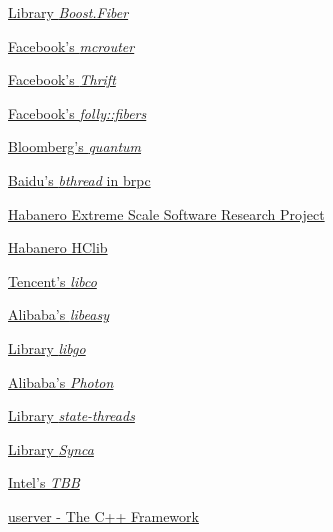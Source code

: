 \begin{thebibliography}{99}
        \href{http://www.boost.org/doc/libs/release/libs/fiber/doc/html/index.html}
        {Library \emph{Boost.Fiber}}

        \href{https://code.facebook.com/posts/296442737213493/introducing-mcrouter-a-memcached-protocol-router-for-scaling-memcached-deployments}
        {Facebook's \emph{mcrouter}}

        \href{https://github.com/facebook/fbthrift}
        {Facebook's \emph{Thrift}}

        \href{https://github.com/facebook/folly/tree/master/folly/fibers}
        {Facebook's \emph{folly::fibers}}

        \href{https://github.com/bloomberg/quantum}
        {Bloomberg's \emph{quantum}}

        \href{https://brpc.apache.org/docs/bthread/}
        {Baidu's \emph{bthread} in brpc}

        \href{https://wiki.rice.edu/confluence/display/HABANERO/Habanero+Extreme+Scale+Software+Research+Project}
        {Habanero Extreme Scale Software Research Project}

        \href{https://github.com/habanero-rice/hclib}
        {Habanero HClib}

        \href{https://github.com/Tencent/libco}
        {Tencent's \emph{libco}}

        \href{https://github.com/oceanbase/oceanbase/tree/develop/deps/easy}
        {Alibaba's \emph{libeasy}}

        \href{https://github.com/yyzybb537/libgo}
        {Library \emph{libgo}}

        \href{https://github.com/alibaba/PhotonLibOS}
        {Alibaba's \emph{Photon}}

        \href{https://github.com/ossrs/state-threads}
        {Library \emph{state-threads}}

        \href{https://github.com/gridem/Synca}
        {Library \emph{Synca}}

        \href{https://github.com/intel/tbb}
        {Intel's \emph{TBB}}

        \href{https://github.com/userver-framework}
        {userver - The C++ Framework}

\end{thebibliography}
